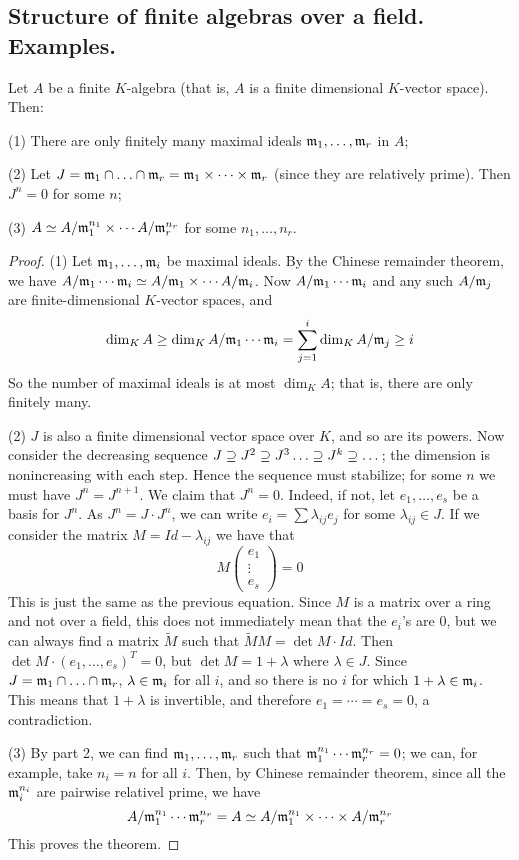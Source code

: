 \subsection{Structure of finite algebras over a field. Examples.}
\begin{thm}
Let $A$ be a finite $K$-algebra (that is, $A$ is a finite dimensional $K$-vector space). Then:

(1) There are only finitely many maximal ideals $\mathfrak{m}_1, \dotsc, \mathfrak{m}_r$ in $A$;

(2) Let $J = \mathfrak{m}_1 \cap \dotsc \cap \mathfrak{m}_r = \mathfrak{m}_1 \times \dotsb \times \mathfrak{m}_r$ (since they are relatively prime).
Then $J^n = 0$ for some $n$;

(3) $A \simeq A / \mathfrak{m}_1^{n_1} \times \dotsb A / \mathfrak{m}_r^{n_r}$ for some $n_1, \dotsc, n_r$.
\end{thm}
\begin{proof}
(1) Let $\mathfrak{m}_1, \dotsc, \mathfrak{m}_i$ be maximal ideals. 
By the Chinese remainder theorem, we have $A / \mathfrak{m}_1 \dotsb \mathfrak{m}_i \simeq A / \mathfrak{m}_1 \times \dotsb A / \mathfrak{m}_i$. 
Now $A / \mathfrak{m}_1 \dotsb \mathfrak{m}_i$ and any such $A / \mathfrak{m}_j$ are finite-dimensional $K$-vector spaces, and 
\[ \dim_K A \geq \dim_K A / \mathfrak{m}_1 \dotsb \mathfrak{m}_i = \sum_{j = 1}^{i} \dim_K A / \mathfrak{m}_j \geq i\]
So the number of maximal ideals is at most $\dim_K A$; that is, there are only finitely many.

(2) $J$ is also a finite dimensional vector space over $K$, and so are its powers.
Now consider the decreasing sequence $J \supseteq J^2 \supseteq J^3 \dotsc \supseteq J^k \supseteq \dotsc$; the dimension is nonincreasing with each step.
Hence the sequence must stabilize; for some $n$ we must have $J^n = J^{n+1}$.
We claim that $J^n = 0$.
Indeed, if not, let $e_1, \dotsc, e_s$ be a basis for $J^n$.
As $J^n = J \cdot J^n$, we can write $e_i = \sum \lambda_{ij}e_j$ for some $\lambda_{ij} \in J$.
If we consider the matrix $M = Id - \lambda_{ij}$ we have that
\[ M \begin{pmatrix} e_1 \\ \vdots \\ e_s \end{pmatrix} = 0 \]
This is just the same as the previous equation.
Since $M$ is a matrix over a ring and not over a field, this does not immediately mean that the $e_i$'s are $0$, but we can always find a matrix $\tilde{M}$ such that $\tilde{M}M = \det{M}\cdot Id$.
Then $\det{M} \cdot (e_1, \dotsc, e_s)^T = 0$, but $\det{M} = 1 + \lambda$ where $\lambda \in J$.
Since $J = \mathfrak{m}_1 \cap \dotsc \cap \mathfrak{m}_r$, $\lambda \in \mathfrak{m}_i$ for all $i$, and so there is no $i$ for which $1 + \lambda \in \mathfrak{m}_i$.
This means that $1 + \lambda$ is invertible, and therefore $e_1 = \dotsb = e_s = 0$, a contradiction.

(3) By part 2, we can find $\mathfrak{m}_1, \dotsc, \mathfrak{m}_r$ such that $\mathfrak{m}_1^{n_1} \dotsb \mathfrak{m}_r^{n_r} = 0$; we can, for example, take $n_i = n$ for all $i$.
Then, by Chinese remainder theorem, since all the $\mathfrak{m}_i^{n_i}$ are pairwise relativel prime, we have 
\[ A / \mathfrak{m}_1^{n_1} \dotsb \mathfrak{m}_r^{n_r} = A \simeq A / \mathfrak{m}_1^{n_1} \times \dotsb \times A / \mathfrak{m}_r^{n_r} \]
This proves the theorem.
\end{proof}

